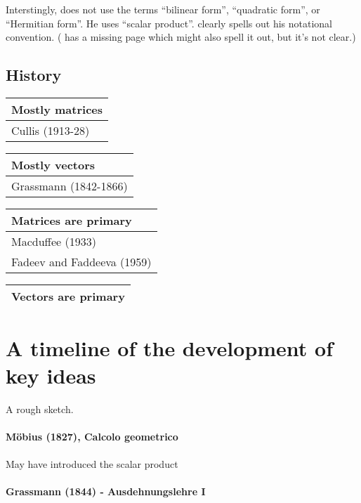 Interstingly, \cite{Householder1953} does not use the terms ``bilinear form'', ``quadratic form'', or ``Hermitian form''. He uses ``scalar product''. \cite{Householder1955} clearly spells out his notational convention. (\cite{Householder1953} has a missing page which might also spell it out, but it's not clear.)


\subsection{History}


\begin{tabular}{l}
Mostly matrices \\
\hline
Cullis (1913-28) \\
\end{tabular}

\begin{tabular}{l}
Mostly vectors \\
\hline
Grassmann (1842-1866) \\
\end{tabular}

\begin{tabular}{l}
Matrices are primary \\
\hline
Macduffee (1933) \\
Fadeev and Faddeeva (1959) \\
\end{tabular}


\begin{tabular}{l}
Vectors are primary \\
\hline

\end{tabular}

\section{A timeline of the development of key ideas}

A rough sketch.

\paragraph{Möbius (1827), Calcolo geometrico}

May have introduced the scalar product

\paragraph{Grassmann (1844) - Ausdehnungslehre I~\cite{Grassmann1844,Grassmann1995}}

